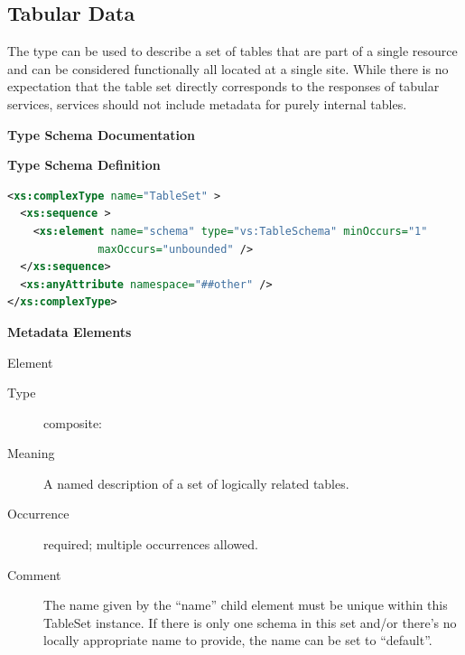 \documentclass[11pt,a4paper]{ivoa}
\begin{document}



\subsection{Tabular Data}
\label{sect:table}


The  type can be used
to describe a set of tables that are part of a single resource and can
be considered functionally all located at a single site.  While there is
no expectation that the table set directly corresponds to the responses
of tabular services,
services should not include metadata for purely internal
tables.



\begin{generated}
\begingroup
      	\renewcommand*\descriptionlabel[1]{%
      	\hbox to 5.5em{\emph{#1}\hfil}}\vspace{2ex}\noindent\textbf{ Type Schema Documentation}


\vspace{1ex}\noindent\textbf{ Type Schema Definition}

\begin{lstlisting}[language=XML,basicstyle=\footnotesize]
<xs:complexType name="TableSet" >
  <xs:sequence >
    <xs:element name="schema" type="vs:TableSchema" minOccurs="1"
              maxOccurs="unbounded" />
  </xs:sequence>
  <xs:anyAttribute namespace="##other" />
</xs:complexType>
\end{lstlisting}

\vspace{0.5ex}\noindent\textbf{ Metadata Elements}

\begingroup\small\begin{bigdescription}\item[Element \xmlel{schema}]
\begin{description}
\item[Type] composite: 
\item[Meaning] 
                A named description of a set of logically related tables.
              
\item[Occurrence] required; multiple occurrences allowed.
\item[Comment] 
                The name given by the “name” child element must
                be unique within this TableSet instance.  If there is
                only one schema in this set and/or there's no locally
                appropriate name to provide, the name can be set to
                “default”.  
              

\end{description}
\end{bigdescription}
\end{generated}
\end{document}
